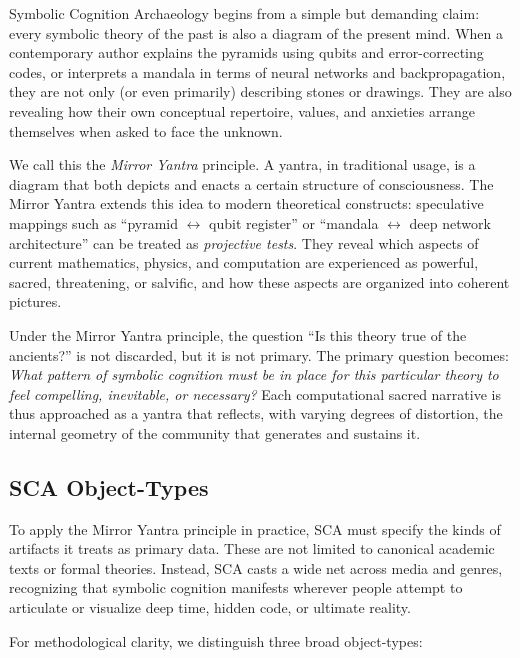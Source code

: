 \documentclass[12]{amsart}
\theoremstyle{plain}
\begin{document}
Symbolic Cognition Archaeology begins from a simple but demanding claim: every symbolic theory of the past is also a diagram of the present mind. When a contemporary author explains the pyramids using qubits and error-correcting codes, or interprets a mandala in terms of neural networks and backpropagation, they are not only (or even primarily) describing stones or drawings. They are also revealing how their own conceptual repertoire, values, and anxieties arrange themselves when asked to face the unknown.

We call this the \emph{Mirror Yantra} principle. A yantra, in traditional usage, is a diagram that both depicts and enacts a certain structure of consciousness. The Mirror Yantra extends this idea to modern theoretical constructs: speculative mappings such as ``pyramid $\leftrightarrow$ qubit register'' or ``mandala $\leftrightarrow$ deep network architecture'' can be treated as \emph{projective tests}. They reveal which aspects of current mathematics, physics, and computation are experienced as powerful, sacred, threatening, or salvific, and how these aspects are organized into coherent pictures.

Under the Mirror Yantra principle, the question ``Is this theory true of the ancients?'' is not discarded, but it is not primary. The primary question becomes: \emph{What pattern of symbolic cognition must be in place for this particular theory to feel compelling, inevitable, or necessary?} Each computational sacred narrative is thus approached as a yantra that reflects, with varying degrees of distortion, the internal geometry of the community that generates and sustains it.

\subsection{SCA Object-Types}

To apply the Mirror Yantra principle in practice, SCA must specify the kinds of artifacts it treats as primary data. These are not limited to canonical academic texts or formal theories. Instead, SCA casts a wide net across media and genres, recognizing that symbolic cognition manifests wherever people attempt to articulate or visualize deep time, hidden code, or ultimate reality.

For methodological clarity, we distinguish three broad object-types:
\end{document}
